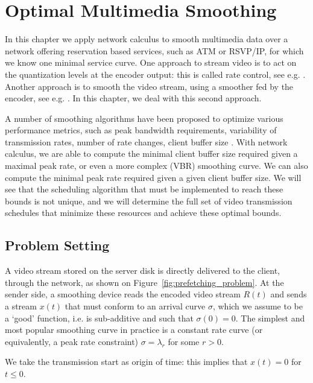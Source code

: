 \chapter{Optimal Multimedia Smoothing}

In this chapter we apply network calculus to smooth multimedia data over a network offering reservation based services, such as ATM or RSVP/IP, for which we know one minimal service curve. One approach to stream video is to act on the quantization levels at the encoder output: this is called rate control, see e.g. \cite{Duffield}. Another approach is to smooth the video stream, using a smoother fed by the encoder, see e.g.  \cite{RexfordTowsley99,Salehi,McManus}. In this chapter, we deal with this second approach.

A number of smoothing algorithms have been proposed to optimize various performance metrics, such as peak bandwidth requirements, variability of transmission rates, number of rate changes, client buffer size \cite{FengRexford99}.  With network calculus, we are able to compute the minimal client buffer size required given a maximal peak rate, or even a more complex (VBR) smoothing curve. We can also compute the minimal peak rate required given a given client buffer size. We will see that the scheduling algorithm that must be implemented to reach these bounds is not unique, and we will determine the full set of video transmission schedules that minimize these resources and achieve these optimal bounds.

\section{Problem Setting}


A video stream stored on the server disk is directly delivered to the client, through the network, as shown on Figure~\ref{fig:prefetching_problem}.
At the sender side, a smoothing device reads the encoded video stream $R(t)$ and sends a stream $x(t)$
that must conform to an arrival curve $\sigma$, which we assume to be a `good' function, i.e. is sub-additive and such that $\sigma(0) = 0$.
The simplest and most popular smoothing curve in practice is a constant rate curve (or equivalently, a peak rate constraint) $\sigma = \lambda_r$ for some $r > 0$.

We take the transmission start as origin of time: this implies that
$x(t) = 0$ for $t \leq 0$.


